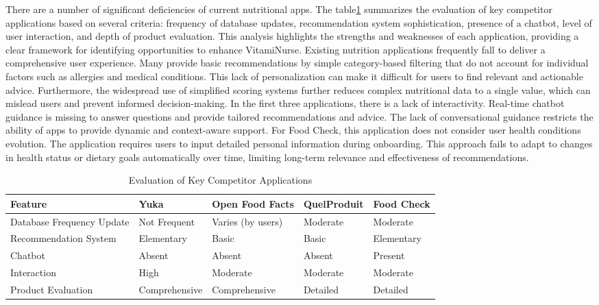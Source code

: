 There are a number of significant deficiencies of current nutritional apps.
The table\ref{tab:competitor_evaluation} summarizes the evaluation of key competitor applications
based on several criteria: frequency of database updates, recommendation
system sophistication, presence of a chatbot, level of user interaction,
and depth of product evaluation. This analysis highlights the strengths
and weaknesses of each application, providing a clear framework for
identifying opportunities to enhance VitamiNurse. Existing nutrition
applications frequently fall to deliver a comprehensive user experience.
Many provide basic recommendations by simple category-based filtering
that do not account for individual factors such as allergies and medical
conditions. This lack of personalization can make it difficult for users
to find relevant and actionable advice. Furthermore, the widespread
use of simplified scoring systems further reduces complex nutritional
data to a single value, which can mislead users and prevent informed
decision-making.
In the first three applications, there is a lack of interactivity. Real-time
chatbot guidance is missing to answer questions and provide tailored recommendations and advice. The lack of conversational guidance restricts
the ability of apps to provide dynamic and context-aware support.
For Food Check, this application does not consider user health conditions
evolution. The application requires users to input detailed personal information
during onboarding. This approach fails to adapt to changes in health status or dietary goals automatically over time, limiting long-term relevance
and effectiveness of recommendations.

\begin{table}[htbp]
\centering
\small %
\caption{Evaluation of Key Competitor Applications}
\label{tab:competitor_evaluation}
\begin{tabularx}{1.15\textwidth}{|l|X|X|X|X|}
\hline
\textbf{Feature} & \textbf{Yuka} & \textbf{Open Food Facts} & \textbf{QuelProduit} & \textbf{Food Check} \\
\hline
Database Frequency Update & Not Frequent & Varies (by users) & Moderate & Moderate \\
\hline
Recommendation System & Elementary & Basic & Basic & Elementary \\
\hline
Chatbot & Absent & Absent & Absent & Present \\
\hline
Interaction & High & Moderate & Moderate & Moderate \\
\hline
Product Evaluation & Comprehensive & Comprehensive & Detailed & Detailed \\
\hline
\end{tabularx}
\end{table}


